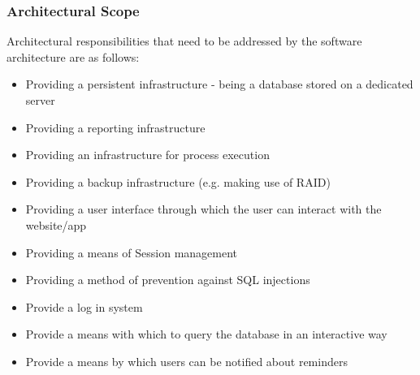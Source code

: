 \documentclass[a4paper]{article}
\begin{document}
	\subsubsection{Architectural Scope}
	Architectural responsibilities that need to be addressed by the software architecture are as follows:
	\begin{itemize}
		\item Providing a persistent infrastructure - being a database stored on a dedicated server
		\item Providing a reporting infrastructure
		\item Providing an infrastructure for process execution
		\item Providing a backup infrastructure (e.g. making use of RAID)
		\item Providing a user interface through which the user can interact with the website/app
		\item Providing a means of Session management
		\item Providing a method of prevention against SQL injections
		\item Provide a log in system
		\item Provide a means with which to query the database in an interactive way
		\item Provide a means by which users can be notified about reminders
	\end{itemize}
\end{document}
